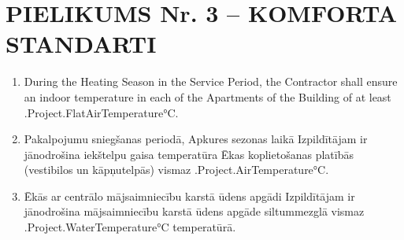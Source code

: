\section{PIELIKUMS Nr. 3 – KOMFORTA STANDARTI}

\begin{enumerate}[label=\arabic*.]
	\item During the Heating Season in the Service Period, the Contractor shall ensure an indoor temperature in each of the Apartments of the Building of at least \iffalse input project.flat_airtemp value="{{.Project.FlatAirTemperature}}" \fi {{.Project.FlatAirTemperature}}°C.

	\item Pakalpojumu sniegšanas periodā, Apkures sezonas laikā Izpildītājam ir jānodrošina iekštelpu gaisa temperatūra Ēkas koplietošanas platībās (vestibilos un kāpņutelpās) vismaz \iffalse input project.airtemp value="{{.Project.AirTemperature}}" \fi {{.Project.AirTemperature}}°C.

	\item Ēkās ar centrālo mājsaimniecību karstā ūdens apgādi Izpildītājam ir jānodrošina mājsaimniecību karstā ūdens apgāde siltummezglā vismaz \iffalse input project.watertemp value="{{.Project.WaterTemperature}}" \fi {{.Project.WaterTemperature}}°C temperatūrā.
\end{enumerate}
